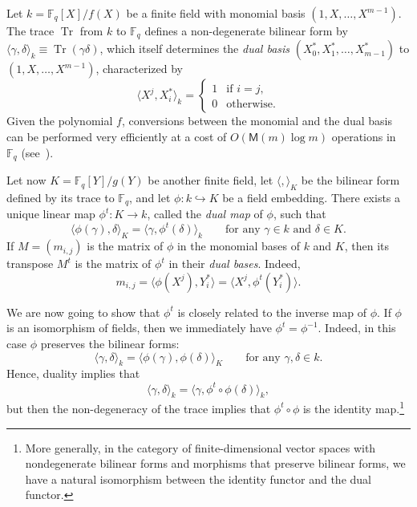 \documentclass[12pt]{article}
\theoremstyle{plain}
\theoremstyle{definition}
\newcommand{\ang}[1]{\langle#1\rangle}
\DeclareMathOperator{\trace}{Tr} %
\def\F{\ensuremath{\mathbb{F}}}
\def\MM{\ensuremath{\mathsf{M}}}
\begin{document}
Let $k=\F_q[X]/f(X)$ be a finite field with monomial basis
$(1,X,\dots,X^{m-1})$. %
The trace $\trace$ from $k$ to $\F_q$ defines a non-degenerate
bilinear form by
$\ang{\gamma,\delta}_k \equiv \trace(\gamma\delta)$,
which itself determines the \emph{dual basis}
$(X_0^*,X_1^*,\dots,X_{m-1}^*)$ to $(1,X,\dots,X^{m-1})$,
characterized by
\begin{equation*}
  \ang{X^j,X_i^*}_k = \begin{cases}
    1 &\text{if $i=j$,}\\
    0 &\text{otherwise.}
  \end{cases}
\end{equation*}
Given the polynomial $f$, conversions between the monomial and the
dual basis can be performed very efficiently at a cost of
$O(\MM(m)\log m)$ operations in $\F_q$ (see~\cite[\S~3]{DeDoSc2014}).

Let now $K=\F_q[Y]/g(Y)$ be another finite field, let $\ang{,}_K$ be
the bilinear form defined by its trace to $\F_q$, and let
$\phi:k\hookrightarrow K$ be a field embedding. %
There exists a unique linear map $\phi^t:K\to k$, called the
\emph{dual map} of $\phi$, such that
\begin{equation*}
  \ang{\phi(\gamma),\delta}_K=\ang{\gamma,\phi^t(\delta)}_k
  \qquad\text{for any $\gamma\in k$ and $\delta\in K$.}
\end{equation*}
If $M=(m_{i,j})$ is the matrix of $\phi$ in the monomial bases of $k$
and $K$, then its transpose $M^t$ is the matrix of $\phi^t$ in their
\emph{dual bases}. %
Indeed,
\begin{equation}
  \label{eq:tellegen-matrix}
  m_{i,j} = \ang{\phi(X^j),Y_i^*} = \ang{X^j,\phi^t(Y_i^*)}.
\end{equation}

We are now going to show that $\phi^t$ is closely related to the
inverse map of $\phi$. %
If $\phi$ is an isomorphism of fields, then we immediately have
$\phi^t=\phi^{-1}$. %
Indeed, in this case $\phi$ preserves the bilinear forms:
\begin{equation*}
  \ang{\gamma,\delta}_k = \ang{\phi(\gamma),\phi(\delta)}_K
  \qquad\text{for any $\gamma,\delta\in k$.}
\end{equation*}
Hence, duality implies that
\begin{equation*}
  \ang{\gamma,\delta}_k = \ang{\gamma,\phi^t\circ\phi(\delta)}_k,
\end{equation*}
but then the non-degeneracy of the trace implies that
$\phi^t\circ\phi$ is the identity map.\footnote{More generally, in the
  category of finite-dimensional vector spaces with nondegenerate
  bilinear forms and morphisms that preserve bilinear forms, we have a
  natural isomorphism between the identity functor and the dual
  functor.}
\end{document}
